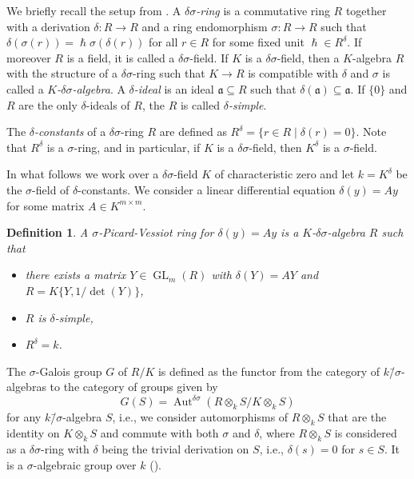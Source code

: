 \documentclass[oneside,reqno]{amsart}
\newtheorem{defi}[theo]{Definition}
\theoremstyle{definition}
\newcommand{\ida}{\mathfrak{a}}
\newcommand{\Gl}{\operatorname{GL}}
\newcommand{\Aut}{\operatorname{Aut}}
\newcommand{\s}{\sigma}
\newcommand{\de}{\delta}
\newcommand{\ds}{\delta\sigma}
\newcommand{\ks}{$k$\=/$\s$}
\begin{document}
We briefly recall the setup from \cite{DiVizioHardouinWibmer:DifferenceGaloisTheoryOfLinearDifferentialEquations}. A \emph{$\ds$-ring} is a commutative ring $R$ together with a derivation $\de\colon R\to R$ and a ring endomorphism $\s\colon R\to R$ such that $\de(\s(r))=\hslash\s(\de(r))$ for all $r\in R$ for some fixed unit $\hslash\in R^\de$. If moreover $R$ is a field, it is called a $\ds$-field. If $K$ is a $\ds$-field, then a $K$-algebra $R$ with the structure of a $\ds$-ring such that $K\to R$ is compatible with $\de$ and $\s$ is called a \emph{$K$-$\ds$-algebra}. A \emph{$\de$-ideal} is an ideal $\ida\subseteq R$ such that $\de(\ida)\subseteq \ida$. If $\{0\}$ and $R$ are the only $\de$-ideals of $R$, the $R$ is called \emph{$\de$-simple}.

The \emph{$\de$-constants} of a $\ds$-ring $R$ are defined as $R^{\de}=\{r\in R \mid \de(r)=0\}$. Note that $R^{\de}$ is a $\s$-ring, and in particular, if $K$ is a $\ds$-field, then $K^{\de}$ is a $\s$-field. 

In what follows we work over a $\ds$-field $K$ of characteristic zero and let $k=K^\de$ be the $\s$-field of $\de$-constants. We consider a linear differential equation $\de(y)=Ay$ for some matrix $A\in K^{m\times m}$.


\begin{defi} \label{def: sPVring}
	A \emph{$\s$-Picard-Vessiot ring}
	for $\de(y)=A y$ is a $K$-$\ds$-algebra $R$ such that
	\begin{itemize}
		\item there exists a matrix $Y\in\Gl_m(R)$ with $\de(Y)=AY$ and $R=K\{Y,1/\det(Y)\}$,
		\item $R$ is $\de$-simple,
		\item $R^\de=k$. 
	\end{itemize} 
\end{defi}
The $\s$-Galois group $G$ of $R/K$ is defined as the functor from the category of \ks-algebras to the category of groups given by 
$$G(S)=\Aut^{\ds}(R\otimes_k S/K\otimes_k S)$$
for any \ks-algebra $S$, i.e., we consider automorphisms of $R\otimes_k S$ that are the identity on $K\otimes_k S$ and commute with both $\s$ and $\delta$, where $R\otimes_k S$ is considered as a $\ds$-ring with $\de$ being the trivial derivation on $S$, i.e., $\de(s)=0$ for $s\in S$. 
It is a $\s$-algebraic group over $k$ (\cite[Prop. 2.5]{DiVizioHardouinWibmer:DifferenceGaloisTheoryOfLinearDifferentialEquations}).
%
\end{document}
